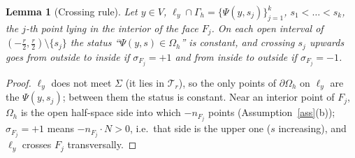 \documentclass[11pt]{article}
\newtheorem{lemma}[theorem]{Lemma}
\theoremstyle{definition}
\newcommand{\Gh}{\Gamma_h}
\newcommand{\Oh}{\Omega_h}
\begin{document}
\begin{lemma}[Crossing rule]\label{lem:cross}
Let $y\in V$, $\ell_y\cap\Gh=\{\Psi(y,s_j)\}_{j=1}^k$, $s_1<\dots<s_k$, the $j$-th point lying in the interior of the face $F_j$. On each open interval of $(-\frac r2,\frac r2)\setminus\{s_j\}$ the status ``$\Psi(y,s)\in\Oh$'' is constant, and crossing $s_j$ upwards goes from outside to inside if $\sigma_{F_j}=+1$ and from inside to outside if $\sigma_{F_j}=-1$.
\end{lemma}
\begin{proof}
$\ell_y$ does not meet $\Sigma$ (it lies in $\mathcal T_r$), so the only points of $\partial\Oh$ on $\ell_y$ are the $\Psi(y,s_j)$; between them the status is constant. Near an interior point of $F_j$, $\Oh$ is the open half-space side into which $-n_{F_j}$ points (Assumption~\ref{ass}(b)); $\sigma_{F_j}=+1$ means $-n_{F_j}\cdot N>0$, i.e.\ that side is the upper one ($s$ increasing), and $\ell_y$ crosses $F_j$ transversally.
\end{proof}
\end{document}
